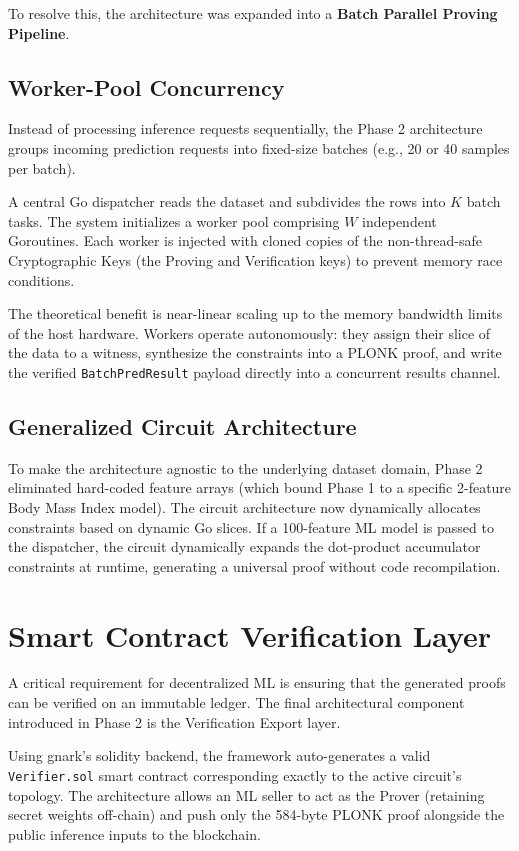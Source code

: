 To resolve this, the architecture was expanded into a \textbf{Batch Parallel Proving Pipeline}.

\subsection{Worker-Pool Concurrency}
Instead of processing inference requests sequentially, the Phase 2 architecture groups incoming prediction requests into fixed-size batches (e.g., 20 or 40 samples per batch). 

A central Go dispatcher reads the dataset and subdivides the rows into $K$ batch tasks. The system initializes a worker pool comprising $W$ independent Goroutines. Each worker is injected with cloned copies of the non-thread-safe Cryptographic Keys (the Proving and Verification keys) to prevent memory race conditions. 

The theoretical benefit is near-linear scaling up to the memory bandwidth limits of the host hardware. Workers operate autonomously: they assign their slice of the data to a witness, synthesize the constraints into a PLONK proof, and write the verified \texttt{BatchPredResult} payload directly into a concurrent results channel.

\subsection{Generalized Circuit Architecture}
To make the architecture agnostic to the underlying dataset domain, Phase 2 eliminated hard-coded feature arrays (which bound Phase 1 to a specific 2-feature Body Mass Index model). The circuit architecture now dynamically allocates constraints based on dynamic Go slices. If a 100-feature ML model is passed to the dispatcher, the circuit dynamically expands the dot-product accumulator constraints at runtime, generating a universal proof without code recompilation.

\section{Smart Contract Verification Layer}
A critical requirement for decentralized ML is ensuring that the generated proofs can be verified on an immutable ledger. The final architectural component introduced in Phase 2 is the Verification Export layer.

Using gnark's solidity backend, the framework auto-generates a valid \texttt{Verifier.sol} smart contract corresponding exactly to the active circuit's topology. The architecture allows an ML seller to act as the Prover (retaining secret weights off-chain) and push only the 584-byte PLONK proof alongside the public inference inputs to the blockchain.
